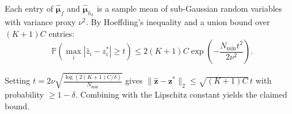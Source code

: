 \documentclass[journal]{IEEEtran}
\theoremstyle{definition}
\begin{document}
Each entry of $\hat{\boldsymbol{\mu}}_f$ and $\hat{\boldsymbol{\mu}}_{h_k}$ is a sample mean of sub-Gaussian random variables with variance proxy $\nu^2$. By Hoeffding's inequality and a union bound over $(K+1)C$ entries:
\begin{equation}
\mathbb{P}\!\left(\max_i |\hat{z}_i - z_i^*| \ge t\right) \le 2(K+1)C\exp\!\left(-\frac{N_{\min}t^2}{2\nu^2}\right).
\end{equation}

Setting $t = 2\nu\sqrt{\frac{\log(2(K+1)C/\delta)}{N_{\min}}}$ gives $\|\hat{\mathbf{z}} - \mathbf{z}^*\|_2 \le \sqrt{(K+1)C}\,t$ with probability $\ge 1-\delta$. Combining with the Lipschitz constant yields the claimed bound.
\end{document}
